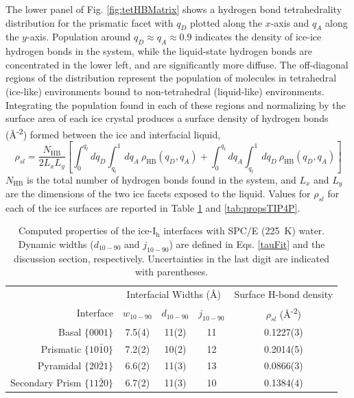 The lower panel of Fig. \ref{fig:tetHBMatrix} shows a hydrogen bond
tetrahedrality distribution for the prismatic facet with $q_{D}$
plotted along the $x$-axis and $q_{A}$ along the $y$-axis.  Population
around $q_{D} \approx q_{A} \approx 0.9$ indicates the density of
ice-ice hydrogen bonds in the system, while the liquid-state hydrogen
bonds are concentrated in the lower left, and are significantly more
diffuse.  The off-diagonal regions of the distribution represent the
population of molecules in tetrahedral (ice-like) environments bound
to non-tetrahedral (liquid-like) environments. Integrating the
population found in each of these regions and normalizing by the
surface area of each ice crystal produces a surface density of
hydrogen bonds (\AA\textsuperscript{-2}) formed between the ice and
interfacial liquid,
\begin{equation}\label{hbondDensity}
\rho_{sl} = \frac{N_\mathrm{HB}}{2 L_{x}L_{y}} \left[ \int_0^{q_{t}}
  dq_{D} \int_{q_{t}}^1 dq_{A}~\rho_\mathrm{HB}(q_{D},q_{A}) +  \int_0^{q_{t}}
  dq_{A} \int_{q_{t}}^1 dq_{D}~\rho_\mathrm{HB}(q_{D},q_{A}) \right]
\end{equation}
$N_\mathrm{HB}$ is the total number of hydrogen bonds found in the
system, and $L_x$ and $L_y$ are the dimensions of the two ice facets
exposed to the liquid.  Values for $\rho_{sl}$ for each of the ice
surfaces are reported in Table \ref{tab:propsSPCE} and \ref{tab:propsTIP4P}.

\begin{table}[h]
\centering
\caption{Computed properties of the
  ice-I$_\mathrm{h}$ interfaces with SPC/E (225~K)
  water. Dynamic widths ($d_\mathrm{10-90}$ and $j_\mathrm{10-90}$)
  are defined in Eqs. \eqref{tauFit} and the discussion section,
  respectively. Uncertainties in the last digit are indicated with
  parentheses.\label{tab:propsSPCE}} 
\begin{tabular}{r|ccc|c}  
  \toprule
  & \multicolumn{3}{c|}{Interfacial Widths (\AA)} & Surface H-bond density \\
  Interface & $w_\mathrm{10-90}$ &  $d_\mathrm{10-90}$ & $j_\mathrm{10-90}$ & $\rho_{sl}$ (\AA\textsuperscript{-2}) \\ 
  \midrule
  Basal  $\{0001\}$                 & 7.5(4) & 11(2) & 11 & 0.1227(3)  \\
  Prismatic  $\{10\bar{1}0\}$       & 7.2(2) & 10(2) & 12 & 0.2014(5)  \\
  Pyramidal  $\{20\bar{2}1\}$       & 6.6(2) & 11(3) & 13 & 0.0866(3)  \\
  Secondary Prism  $\{11\bar{2}0\}$ & 6.7(2) & 11(3) & 10 & 0.1384(4)  \\ 
  \bottomrule
\end{tabular}
\end{table}

